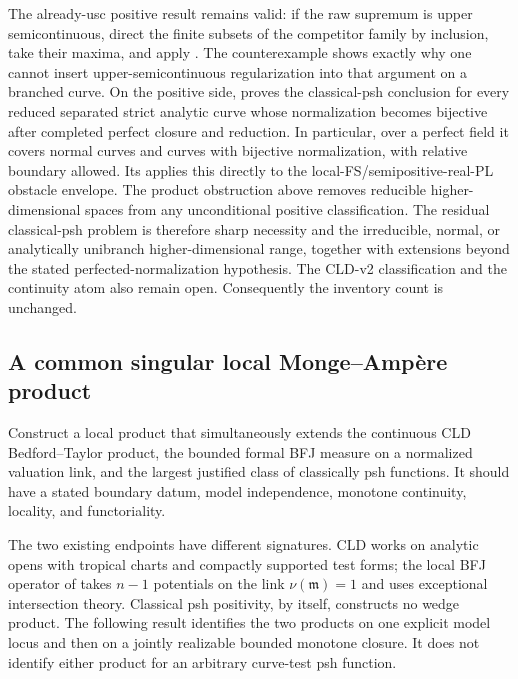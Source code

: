 The already-usc positive result remains valid: if the raw supremum is upper
semicontinuous, direct the finite subsets of the competitor family by
inclusion, take their maxima, and apply
\cite[Theorem~6.5]{GR25Classical}.  The counterexample shows exactly why one
cannot insert upper-semicontinuous regularization into that argument on a
branched curve.  On the positive side,
 proves the classical-psh
conclusion for every reduced separated strict analytic curve whose
normalization becomes bijective after completed perfect closure and
reduction.  In particular, over a perfect field it covers normal curves and
curves with bijective normalization, with relative boundary allowed.  Its
 applies this directly
to the local-FS/semipositive-real-PL obstacle envelope.  The product
obstruction above removes reducible higher-dimensional spaces from any
unconditional positive classification.  The residual classical-psh problem
is therefore sharp necessity and the irreducible, normal, or analytically
unibranch higher-dimensional range, together with extensions beyond the
stated perfected-normalization hypothesis.  The CLD-v2 classification and
the continuity atom also remain open.  Consequently the inventory count is
unchanged.

\subsection{A common singular local Monge--Ampère product}

\begin{problem}\label{prob:frontier-local-ma}
Construct a local product that simultaneously extends the continuous CLD
Bedford--Taylor product, the bounded formal BFJ measure on a normalized
valuation link, and the largest justified class of classically psh functions.
It should have a stated boundary datum, model independence, monotone
continuity, locality, and functoriality.
\end{problem}

The two existing endpoints have different signatures.  CLD works on analytic
opens with tropical charts and compactly supported test forms; the local BFJ
operator of  takes \(n-1\) potentials on the link
\(\nu(\mathfrak m)=1\) and uses exceptional intersection theory.  Classical
psh positivity, by itself, constructs no wedge product.  The following
result identifies the two products on one explicit model locus and then on a
jointly realizable bounded monotone closure.  It does not identify either
product for an arbitrary curve-test psh function.

